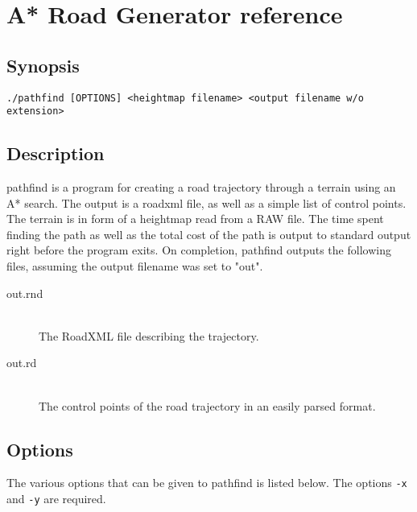 \chapter{A* Road Generator reference}

\section*{Synopsis}
\texttt{./pathfind [OPTIONS] <heightmap filename> <output filename w/o extension>}

\section*{Description}
pathfind is a program for creating a road trajectory through a terrain using an A* search. The output is a roadxml file, as well as a simple list of control points. The terrain is in form of a heightmap read from a RAW file. The time spent finding the path as well as the total cost of the path is output to standard output right before the program exits. On completion, pathfind outputs the following files, assuming the output filename was set to "out".
\begin{description}
\item[out.rnd] \hfill \\
The RoadXML file describing the trajectory.
\item[out.rd] \hfill \\
The control points of the road trajectory in an easily parsed format.
\end{description}



\section*{Options}
The various options that can be given to pathfind is listed below. The options \texttt{-x} and \texttt{-y} are required.

